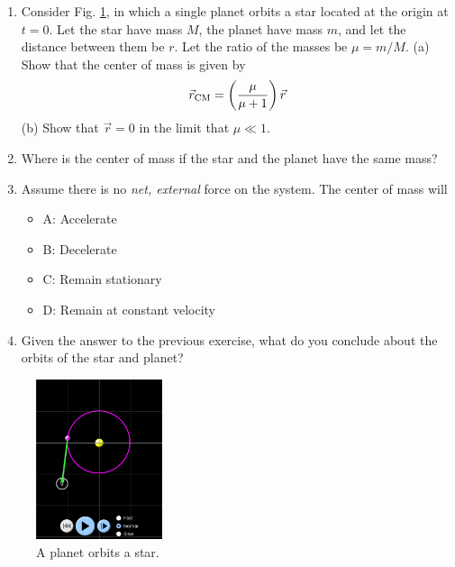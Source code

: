 \documentclass{article}
\begin{document}
\begin{enumerate}
\item Consider Fig. \ref{fig:1}, in which a single planet orbits a star located at the origin at $t=0$. Let the star have mass $M$, the planet have mass $m$, and let the distance between them be $r$.  Let the ratio of the masses be $\mu = m/M$.  (a) Show that the center of mass is given by 
\begin{equation}
\vec{r}_{\rm CM} = \left(\frac{\mu}{\mu+1}\right)\vec{r}
\end{equation}
(b) Show that $\vec{r} = 0$ in the limit that $\mu \ll 1$.
\\ \vspace{3cm}
\item Where is the center of mass if the star and the planet have the same mass? \\ \vspace{2cm}
\item Assume there is no \textit{net, external} force on the system.  The center of mass will
\begin{itemize}
\item A: Accelerate 
\item B: Decelerate
\item C: Remain stationary
\item D: Remain at constant velocity
\end{itemize}
\item Given the answer to the previous exercise, what do you conclude about the orbits of the star and planet? \\ \vspace{1cm}
\end{enumerate}

\begin{figure}[hb]
\centering
\includegraphics[width=0.33\textwidth]{figures/orbit.png}
\caption{\label{fig:1} A planet orbits a star.}
\end{figure}
\end{document}
